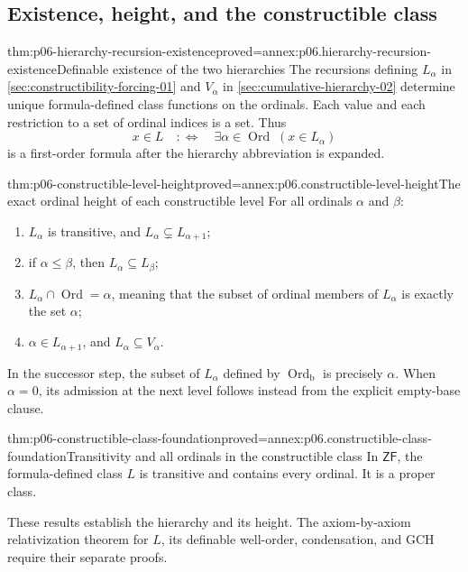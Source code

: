 \subsection{Existence, height, and the constructible class}

\begin{hbtheorem}{thm:p06-hierarchy-recursion-existence}{proved=annex:p06.hierarchy-recursion-existence}{Definable existence of the two hierarchies}
The recursions defining \(L_\alpha\) in
\cref{sec:constructibility-forcing-01} and \(V_\alpha\) in
\cref{sec:cumulative-hierarchy-02} determine unique formula-defined
class functions on the ordinals.  Each value and each restriction
to a set of ordinal indices is a set.  Thus
\[
 x\in L\quad:\Longleftrightarrow\quad
   \exists\alpha\in\operatorname{Ord}\;(x\in L_\alpha)
\]
is a first-order formula after the hierarchy abbreviation is expanded.
\end{hbtheorem}

\begin{hbtheorem}{thm:p06-constructible-level-height}{proved=annex:p06.constructible-level-height}{The exact ordinal height of each constructible level}
For all ordinals \(\alpha\) and \(\beta\):
\begin{enumerate}
 \item \(L_\alpha\) is transitive, and
       \(L_\alpha\subsetneq L_{\alpha+1}\);
 \item if \(\alpha\leq\beta\), then
       \(L_\alpha\subseteq L_\beta\);
 \item \(L_\alpha\cap\operatorname{Ord}=\alpha\), meaning that
       the subset of ordinal members of \(L_\alpha\) is exactly
       the set \(\alpha\);
 \item \(\alpha\in L_{\alpha+1}\), and
       \(L_\alpha\subseteq V_\alpha\).
\end{enumerate}
In the successor step, the subset of \(L_\alpha\) defined by
\(\operatorname{Ord}_{\mathrm b}\) is precisely \(\alpha\).
When \(\alpha=0\), its admission at the next level follows instead
from the explicit empty-base clause.
\end{hbtheorem}

\begin{hbcorollary}{thm:p06-constructible-class-foundation}{proved=annex:p06.constructible-class-foundation}{Transitivity and all ordinals in the constructible class}
In \(\mathsf{ZF}\), the formula-defined class \(L\) is transitive and
contains every ordinal.  It is a proper class.
\end{hbcorollary}

These results establish the hierarchy and its height.  The axiom-by-axiom
relativization theorem for \(L\), its definable well-order, condensation,
and GCH require their separate proofs.
